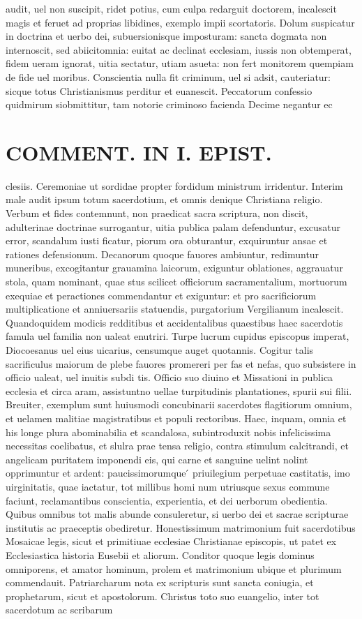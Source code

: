 \documentclass{article}
\begin{document}
\begin{pages}
audit, uel non suscipit, ridet potius, cum culpa redarguit doctorem, incalescit magis et feruet ad proprias libidines, exemplo impii scortatoris. Dolum suspicatur in doctrina et uerbo dei, subuersionisque imposturam: sancta dogmata non internoscit, sed abiicitomnia: euitat ac declinat ecclesiam, iussis non obtemperat, fidem ueram ignorat, uitia sectatur, utiam asueta: non fert monitorem quempiam de fide uel moribus. Conscientia nulla fit criminum, uel si adsit, cauteriatur: sicque totus Christianismus perditur et euanescit. Peccatorum confessio quidmirum siobmittitur, tam notorie criminoso facienda Decime negantur ec\pend
\section*{COMMENT. IN I. EPIST. }
\marginpar{[ p.494 ]}\pstart clesiis. Ceremoniae ut sordidae propter fordidum ministrum irridentur. Interim male audit ipsum totum sacerdotium, et omnis denique Christiana religio. Verbum et fides contemnunt, non praedicat sacra scriptura, non discit, adulterinae doctrinae surrogantur, uitia publica palam defenduntur, excusatur error, scandalum iusti ficatur, piorum ora obturantur, exquiruntur ansae et rationes defensionum. Decanorum quoque fauores ambiuntur, redimuntur muneribus, excogitantur grauamina laicorum, exiguntur oblationes, aggrauatur stola, quam nominant, quae stus scilicet officiorum sacramentalium, mortuorum exequiae et peractiones commendantur et exiguntur: et pro sacrificiorum multiplicatione et anniuersariis statuendis, purgatorium Vergilianum incalescit. Quandoquidem modicis redditibus et accidentalibus quaestibus haec sacerdotis famula uel familia non ualeat enutriri. Turpe lucrum cupidus episcopus imperat, Diocoesanus uel eius uicarius, censumque auget quotannis. Cogitur talis sacrificulus maiorum de plebe fauores promereri per fas et nefas, quo subsistere in officio ualeat, uel inuitis subdi tis. Officio suo diuino et Missationi in publica ecclesia et circa aram, assistuntno uellae turpitudinis plantationes, spurii sui filii. Breuiter, exemplum sunt huiusmodi concubinarii sacerdotes flagitiorum omnium, et uelamen malitiae magistratibus et populi rectoribus. Haec, inquam, omnia et his longe plura abominabilia et scandalosa, subintroduxit nobis infelicissima necessitas coelibatus, et slulra prae tensa religio, contra stimulum calcitrandi, et angelicam puritatem imponendi eis, qui carne et sanguine uelint nolint opprimuntur et ardent: paucissimorumque ́ priuilegium perpetuae castitatis, imo uirginitatis, quae iactatur, tot millibus homi num utriusque sexus commune faciunt, reclamantibus conscientia, experientia, et dei uerborum obedientia. Quibus omnibus tot malis abunde consuleretur, si uerbo dei et sacrae scripturae institutis ac praeceptis obediretur. Honestissimum matrimonium fuit sacerdotibus Mosaicae legis, sicut et primitiuae ecclesiae Christianae episcopis, ut patet ex Ecclesiastica historia Eusebii et aliorum. Conditor quoque legis dominus omniporens, et amator hominum, prolem et matrimonium ubique et plurimum commendauit. Patriarcharum nota ex scripturis sunt sancta coniugia, et prophetarum, sicut et apostolorum. Christus toto suo euangelio, inter tot sacerdotum ac scribarum 
\end{pages}
\end{document}
